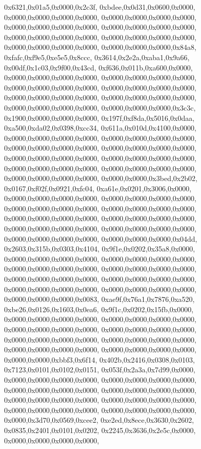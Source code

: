 {	0x6321,0x01a5,0x0000,0x2c3f,
	0xbdee,0x0d31,0x0600,0x0000,
	0x0000,0x0000,0x0000,0x0000,
	0x0000,0x0000,0x0000,0x0000,
	0x0000,0x0000,0x0000,0x0000,
	0x0000,0x0000,0x0000,0x0000,
	0x0000,0x0000,0x0000,0x0000,
	0x0000,0x0000,0x0000,0x0000,
	0x0000,0x0000,0x0000,0x0000,
	0x0000,0x0000,0x0000,0x84a8,
	0xfafc,0xf9e5,0xe5e5,0x8ccc,
	0x3614,0x2e2a,0xaba1,0x9a66,
	0x00df,0x1c03,0x9f00,0x43cd,
	0xf636,0x011b,0xa600,0x0000,
	0x0000,0x0000,0x0000,0x0000,
	0x0000,0x0000,0x0000,0x0000,
	0x0000,0x0000,0x0000,0x0000,
	0x0000,0x0000,0x0000,0x0000,
	0x0000,0x0000,0x0000,0x0000,
	0x0000,0x0000,0x0000,0x0000,
	0x0000,0x0000,0x0000,0x0000,
	0x0000,0x0000,0x0000,0x3c3c,
	0x1900,0x0000,0x0000,0x0000,
	0x197f,0xf8da,0x5016,0x0daa,
	0xa500,0xda02,0x0398,0xcc34,
	0x611a,0x010d,0x4100,0x0000,
	0x0000,0x0000,0x0000,0x0000,
	0x0000,0x0000,0x0000,0x0000,
	0x0000,0x0000,0x0000,0x0000,
	0x0000,0x0000,0x0000,0x0000,
	0x0000,0x0000,0x0000,0x0000,
	0x0000,0x0000,0x0000,0x0000,
	0x0000,0x0000,0x0000,0x0000,
	0x0000,0x0000,0x0000,0x0000,
	0x0000,0x0000,0x0000,0x0000,
	0x0000,0x0000,0x3bed,0x2b02,
	0x0167,0xf02f,0x0921,0xfc04,
	0xa61e,0x0201,0x3006,0x0000,
	0x0000,0x0000,0x0000,0x0000,
	0x0000,0x0000,0x0000,0x0000,
	0x0000,0x0000,0x0000,0x0000,
	0x0000,0x0000,0x0000,0x0000,
	0x0000,0x0000,0x0000,0x0000,
	0x0000,0x0000,0x0000,0x0000,
	0x0000,0x0000,0x0000,0x0000,
	0x0000,0x0000,0x0000,0x0000,
	0x0000,0x0000,0x0000,0x0000,
	0x0000,0x0000,0x0000,0x04dd,
	0x2603,0x315b,0x0303,0x4104,
	0x9f1e,0x0202,0x35a8,0x0000,
	0x0000,0x0000,0x0000,0x0000,
	0x0000,0x0000,0x0000,0x0000,
	0x0000,0x0000,0x0000,0x0000,
	0x0000,0x0000,0x0000,0x0000,
	0x0000,0x0000,0x0000,0x0000,
	0x0000,0x0000,0x0000,0x0000,
	0x0000,0x0000,0x0000,0x0000,
	0x0000,0x0000,0x0000,0x0000,
	0x0000,0x0000,0x0000,0x0083,
	0xae9f,0x76a1,0x7876,0xa520,
	0xbe26,0x0126,0x1603,0x0ea6,
	0x9f1c,0x0202,0x15fb,0x0000,
	0x0000,0x0000,0x0000,0x0000,
	0x0000,0x0000,0x0000,0x0000,
	0x0000,0x0000,0x0000,0x0000,
	0x0000,0x0000,0x0000,0x0000,
	0x0000,0x0000,0x0000,0x0000,
	0x0000,0x0000,0x0000,0x0000,
	0x0000,0x0000,0x0000,0x0000,
	0x0000,0x0000,0x0000,0x0000,
	0x0000,0x0000,0xbbf3,0x6f14,
	0x402b,0x2416,0x0308,0x0103,
	0x7123,0x0101,0x0102,0x0151,
	0x053f,0x2a3a,0x7d99,0x0000,
	0x0000,0x0000,0x0000,0x0000,
	0x0000,0x0000,0x0000,0x0000,
	0x0000,0x0000,0x0000,0x0000,
	0x0000,0x0000,0x0000,0x0000,
	0x0000,0x0000,0x0000,0x0000,
	0x0000,0x0000,0x0000,0x0000,
	0x0000,0x0000,0x0000,0x0000,
	0x0000,0x0000,0x0000,0x0000,
	0x0000,0x3d70,0x0569,0xcee2,
	0xe2ed,0x8ece,0x3630,0x2602,
	0x0835,0x2401,0x0101,0x0202,
	0x2245,0x3636,0x2e5c,0x0000,
	0x0000,0x0000,0x0000,0x0000,
}

